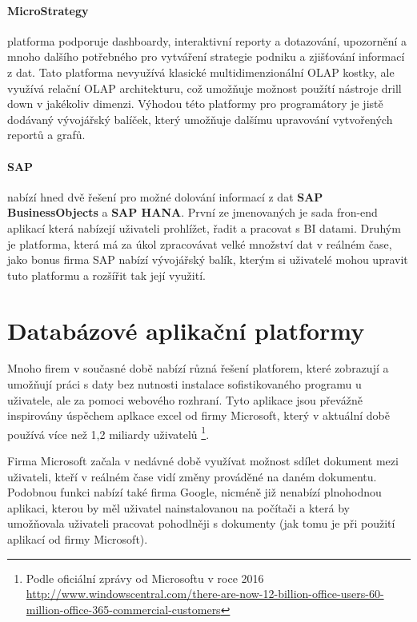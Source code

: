 \paragraph{MicroStrategy} platforma podporuje dashboardy, interaktivní reporty a dotazování, upozornění a mnoho dalšího potřebného pro vytváření strategie podniku a zjišťování informací z dat. Tato platforma nevyužívá klasické multidimenzionální OLAP kostky, ale využívá relační OLAP architekturu, což umožňuje možnost použítí nástroje drill down v jakékoliv dimenzi. Výhodou této platformy pro programátory je jistě dodávaný vývojářský balíček, který umožňuje dalšímu upravování vytvořených reportů a grafů. \cite{microstrategy}

\paragraph{SAP} nabízí hned dvě řešení pro možné dolování informací z dat \textbf{SAP BusinessObjects} a \textbf{SAP HANA}. První ze jmenovaných je sada fron-end aplikací která nabízejí uživateli prohlížet, řadit a pracovat s BI datami. Druhým je platforma, která má za úkol zpracovávat velké množství dat v reálném čase, jako bonus firma SAP nabízí vývojářský balík, kterým si uživatelé mohou upravit tuto platformu a rozšířit tak její využití. \cite{sap}

\section{Databázové aplikační platformy}
\par Mnoho firem v současné době nabízí různá řešení platforem, které zobrazují a umožňují práci s daty bez nutnosti instalace sofistikovaného programu u uživatele, ale za pomoci webového rozhraní. Tyto aplikace jsou převážně inspirovány úspěchem aplkace excel od firmy Microsoft, který v aktuální době používá více než 1,2 miliardy uživatelů \footnote{Podle oficiální zprávy od Microsoftu v roce 2016 \url{http://www.windowscentral.com/there-are-now-12-billion-office-users-60-million-office-365-commercial-customers}}. \par Firma Microsoft začala v nedávné době využívat možnost sdílet dokument mezi uživateli, kteří v reálném čase vidí změny prováděné na daném dokumentu. Podobnou funkci nabízí také firma Google, nicméně již nenabízí plnohodnou aplikaci, kterou by měl uživatel nainstalovanou na počítači a která by umožňovala uživateli pracovat pohodlněji s dokumenty (jak tomu je při použití aplikací od firmy Microsoft).

